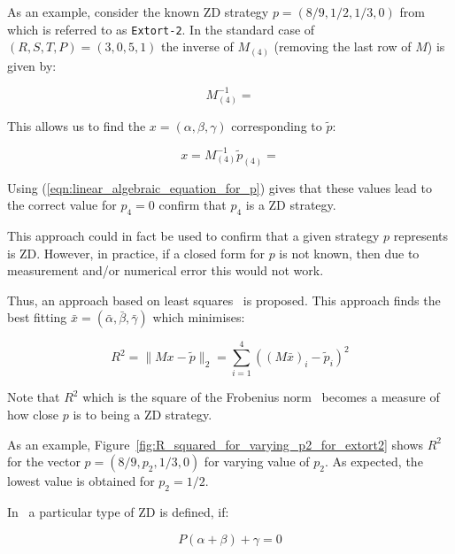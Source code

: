 \documentclass[a4paper]{article}
\begin{document}
As an example, consider the known ZD strategy \(p=(8 / 9, 1 / 2, 1 / 3, 0)\)
from~\cite{Stewart2012} which is referred to as \texttt{Extort-2}. In the
standard case of \((R, S, T, P)=(3, 0, 5, 1)\) the inverse
of \(M_{(4)}\) (removing the last row of \(M\)) is given by:

\begin{equation}\label{eqn:inverse_of_M4}
    M_{(4)}^{-1} =
    
\end{equation}

This allows us to find the \(x=(\alpha, \beta, \gamma)\) corresponding to
\(\tilde p\):

\begin{equation}\label{eqn:alpha_beta_gamma_for_extort_2}
    x = M_{(4)}^{-1}\tilde p_{(4)} =
    
\end{equation}

Using (\ref{eqn:linear_algebraic_equation_for_p}) gives that these values lead
to the correct value for \(p_4=0\) confirm that \(p_4\) is a ZD strategy.

This approach could in fact be used to confirm that a given strategy \(p\)
represents is ZD. However, in practice, if a closed form for \(p\) is not
known, then due to measurement and/or numerical error this would not work.

Thus, an approach based on least squares~\cite{Golub2013} is proposed. This
approach finds the best fitting \(\bar x=(\bar\alpha, \bar\beta,
\bar\gamma)\) which minimises:

\begin{equation}\label{eqn:r_squared}
R^2 = \|M x-\tilde p\|_2 = \sum_{i=1}^{4}\left((M\bar x)_i-\tilde p_i\right)^2
\end{equation}

Note that \(R^2\) which is the square of the Frobenius norm~\cite{Golub2013}
becomes a measure of how close \(p\) is to being a ZD strategy.

As an example, Figure~\ref{fig:R_squared_for_varying_p2_for_extort2} shows
\(R^2\) for the vector \(p=(8/9, p_2, 1/3, 0)\) for varying value of \(p_2\). As
expected, the lowest value is obtained for \(p_2=1/2\).

In~\cite{Press2012} a particular type of ZD is defined, if:

\begin{equation}\label{eqn:constraint_for_extortion}
    P(\alpha + \beta)+\gamma=0
\end{equation}
\end{document}
